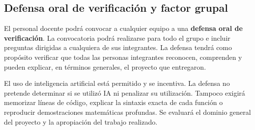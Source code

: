 \documentclass[12pt]{article}
\begin{document}
%

\subsection*{Defensa oral de verificación y factor grupal}

El personal docente podrá convocar a cualquier equipo a una \textbf{defensa oral de verificación}. La convocatoria podrá realizarse para todo el grupo e incluir preguntas dirigidas a cualquiera de sus integrantes. La defensa tendrá como propósito verificar que todas las personas integrantes reconocen, comprenden y pueden explicar, en términos generales, el proyecto que entregaron.

El uso de inteligencia artificial está permitido y se incentiva. La defensa no pretende determinar si se utilizó IA ni penalizar su utilización. Tampoco exigirá memorizar líneas de código, explicar la sintaxis exacta de cada función o reproducir demostraciones matemáticas profundas. Se evaluará el dominio general del proyecto y la apropiación del trabajo realizado.
\end{document}
